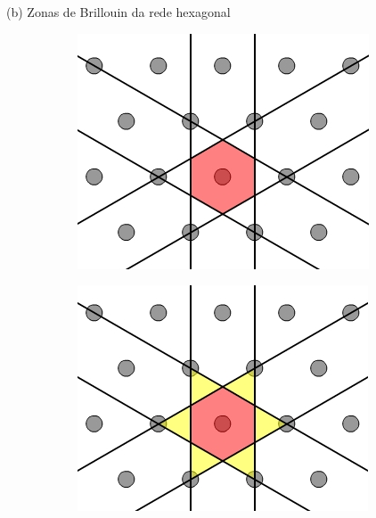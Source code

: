 \documentclass[aspectratio=169]{beamer}
\begin{document}


\begin{frame}{(b) Zonas de Brillouin da rede hexagonal}

\begin{figure}[H]
\centering
\begin{subfigure}{.45\textwidth}
  \centering
  \includegraphics[width=\linewidth]{fig/hexbz_construct-3.png}
\end{subfigure}%
\quad \quad
\begin{subfigure}{.45\textwidth}
  \centering
  \includegraphics[width=\linewidth]{fig/hexbz_construct-4.png}
\end{subfigure}
\end{figure}

\end{frame}
\end{document}
